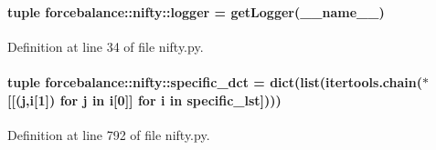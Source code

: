 \hypertarget{namespaceforcebalance_1_1nifty_a94fc8d9a0375d86ee16bfe16c896d74c}{
\paragraph[{logger}]{\setlength{\rightskip}{0pt plus 5cm}tuple {\bf forcebalance\-::nifty\-::logger} = get\-Logger(\-\_\-\-\_\-name\-\_\-\-\_\-)}}\label{namespaceforcebalance_1_1nifty_a94fc8d9a0375d86ee16bfe16c896d74c}


\-Definition at line 34 of file nifty.\-py.

\hypertarget{namespaceforcebalance_1_1nifty_a41091c8b7861352d9cba164b15d0d022}{
\paragraph[{specific\-\_\-dct}]{\setlength{\rightskip}{0pt plus 5cm}tuple {\bf forcebalance\-::nifty\-::specific\-\_\-dct} = dict(list(itertools.\-chain($\ast$\mbox{[}\mbox{[}(j,i\mbox{[}1\mbox{]}) for j in i\mbox{[}0\mbox{]}\mbox{]} for i in {\bf specific\-\_\-lst}\mbox{]})))}}\label{namespaceforcebalance_1_1nifty_a41091c8b7861352d9cba164b15d0d022}


\-Definition at line 792 of file nifty.\-py.

